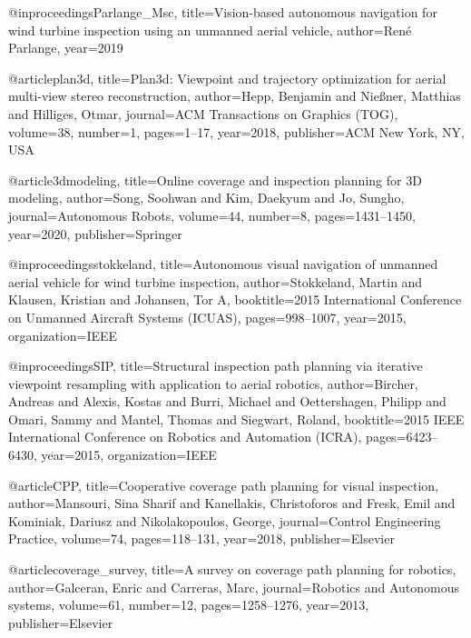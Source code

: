 \begin{thebibliography}{9}


@inproceedings{Parlange_Msc,
  title={Vision-based autonomous navigation for wind turbine inspection using an unmanned aerial vehicle},
  author={Ren{\'e} Parlange},
  year={2019}
}




@article{plan3d,
  title={Plan3d: Viewpoint and trajectory optimization for aerial multi-view stereo reconstruction},
  author={Hepp, Benjamin and Nie{\ss}ner, Matthias and Hilliges, Otmar},
  journal={ACM Transactions on Graphics (TOG)},
  volume={38},
  number={1},
  pages={1--17},
  year={2018},
  publisher={ACM New York, NY, USA}
}

@article{3dmodeling,
  title={Online coverage and inspection planning for 3D modeling},
  author={Song, Soohwan and Kim, Daekyum and Jo, Sungho},
  journal={Autonomous Robots},
  volume={44},
  number={8},
  pages={1431--1450},
  year={2020},
  publisher={Springer}
}


@inproceedings{stokkeland,
  title={Autonomous visual navigation of unmanned aerial vehicle for wind turbine inspection},
  author={Stokkeland, Martin and Klausen, Kristian and Johansen, Tor A},
  booktitle={2015 International Conference on Unmanned Aircraft Systems (ICUAS)},
  pages={998--1007},
  year={2015},
  organization={IEEE}
}

@inproceedings{SIP,
  title={Structural inspection path planning via iterative viewpoint resampling with application to aerial robotics},
  author={Bircher, Andreas and Alexis, Kostas and Burri, Michael and Oettershagen, Philipp and Omari, Sammy and Mantel, Thomas and Siegwart, Roland},
  booktitle={2015 IEEE International Conference on Robotics and Automation (ICRA)},
  pages={6423--6430},
  year={2015},
  organization={IEEE}
}


@article{CPP,
  title={Cooperative coverage path planning for visual inspection},
  author={Mansouri, Sina Sharif and Kanellakis, Christoforos and Fresk, Emil and Kominiak, Dariusz and Nikolakopoulos, George},
  journal={Control Engineering Practice},
  volume={74},
  pages={118--131},
  year={2018},
  publisher={Elsevier}
}





@article{coverage_survey,
  title={A survey on coverage path planning for robotics},
  author={Galceran, Enric and Carreras, Marc},
  journal={Robotics and Autonomous systems},
  volume={61},
  number={12},
  pages={1258--1276},
  year={2013},
  publisher={Elsevier}
}





\end{thebibliography}
